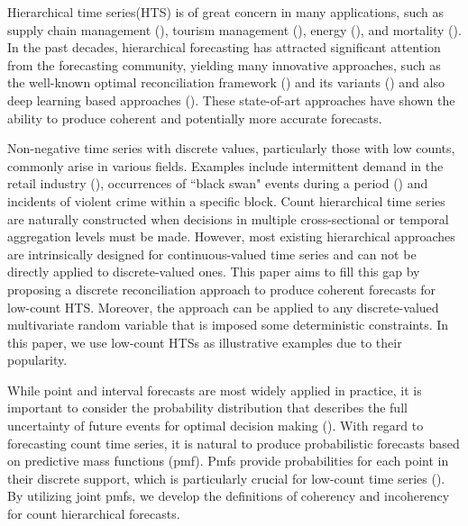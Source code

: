 \documentclass[a4paper,review,12pt,authoryear]{elsarticle}
\begin{document}
Hierarchical time series(HTS) is of great concern in many applications, such as supply chain management (\citealp{babaiDemandForecastingSupply2022}), tourism management (\citealp{kourentzesCrosstemporalCoherentForecasts2019}), energy (\citealp{nystrupTemporalHierarchiesAutocorrelation2020}), and mortality (\citealp{liHierarchicalMortalityForecasting2022}).
In the past decades, hierarchical forecasting has attracted significant attention from the forecasting community, yielding many innovative approaches, such as the well-known optimal reconciliation framework (\citealp{hyndmanOptimalCombinationForecasts2011, wickramasuriyaOptimalForecastReconciliation2019, panagiotelisProbabilisticForecastReconciliation2022}) and its variants () and also deep learning based approaches (\citealp{rangapuramEndtoEndLearningCoherent2021}).
These state-of-art approaches have shown the ability to produce coherent and potentially more accurate forecasts.

Non-negative time series with discrete values, particularly those with low counts, commonly arise in various fields. 
Examples include intermittent demand in the retail industry (\citealp{kourentzesElucidateStructureIntermittent2021}), occurrences of ``black swan" events during a period (\citealp{nikolopoulosWeNeedTalk2020}) and incidents of violent crime within a specific block.
Count hierarchical time series are naturally constructed when decisions in multiple cross-sectional or temporal aggregation levels must be made.
However, most existing hierarchical approaches are intrinsically designed for continuous-valued time series and can not be directly applied to discrete-valued ones. 
This paper aims to fill this gap by proposing a discrete reconciliation approach to produce coherent forecasts for low-count HTS. 
Moreover, the approach can be applied to any discrete-valued multivariate random variable that is imposed some deterministic constraints.  
In this paper, we use low-count HTSs as illustrative examples due to their popularity.

While point and interval forecasts are most widely applied in practice, it is important to consider the probability distribution that describes the full uncertainty of future events for optimal decision making (\citealp{gneitingProbabilisticForecasting2014}).
With regard to forecasting count time series, it is natural to produce probabilistic forecasts based on predictive mass functions (pmf). 
Pmfs provide probabilities for each point in their discrete support,
which is particularly crucial for low-count time series (\citealp{petropoulosForecastingTheoryPractice2022a}).
By utilizing joint pmfs, we develop the definitions of coherency and incoherency for count hierarchical forecasts.
\end{document}
